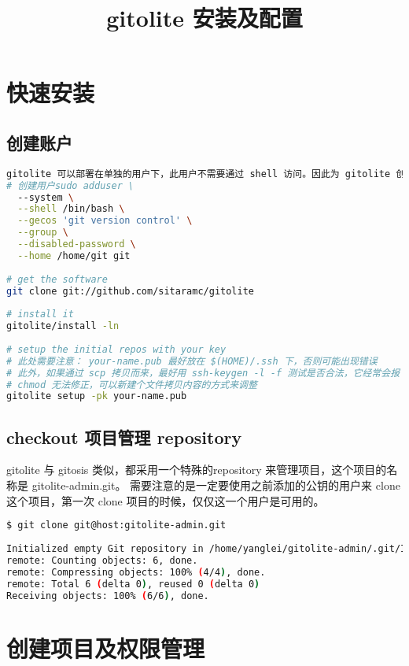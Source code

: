 \documentclass[a4paper,11pt,twoside,openany]{article}
\begin{document}
\title{gitolite 安装及配置}
\maketitle
\section{快速安装}
\subsection{创建账户}
\begin{lstlisting}[language=bash]
gitolite 可以部署在单独的用户下，此用户不需要通过 shell 访问。因此为 gitolite 创建一个单独的用户是比较安全的。
# 创建用户sudo adduser \
  --system \
  --shell /bin/bash \
  --gecos 'git version control' \
  --group \
  --disabled-password \
  --home /home/git git
 
# get the software
git clone git://github.com/sitaramc/gitolite
 
# install it
gitolite/install -ln
 
# setup the initial repos with your key
# 此处需要注意： your-name.pub 最好放在 $(HOME)/.ssh 下，否则可能出现错误
# 此外，如果通过 scp 拷贝而来，最好用 ssh-keygen -l -f 测试是否合法，它经常会报 Permission Denied 错误
# chmod 无法修正，可以新建个文件拷贝内容的方式来调整
gitolite setup -pk your-name.pub
\end{lstlisting}

\subsection{checkout 项目管理 repository}
gitolite 与 gitosis 类似，都采用一个特殊的repository 来管理项目，这个项目的名称是 gitolite-admin.git。 需要注意的是一定要使用之前添加的公钥的用户来 clone 这个项目，第一次 clone 项目的时候，仅仅这一个用户是可用的。
\begin{lstlisting}[language=bash]
$ git clone git@host:gitolite-admin.git
 
Initialized empty Git repository in /home/yanglei/gitolite-admin/.git/Initialized empty Git repository in /home/yanglei/gitolite-admin/.git/
remote: Counting objects: 6, done.
remote: Compressing objects: 100% (4/4), done.
remote: Total 6 (delta 0), reused 0 (delta 0)
Receiving objects: 100% (6/6), done.
\end{lstlisting}

\section{创建项目及权限管理}
\end{document}
